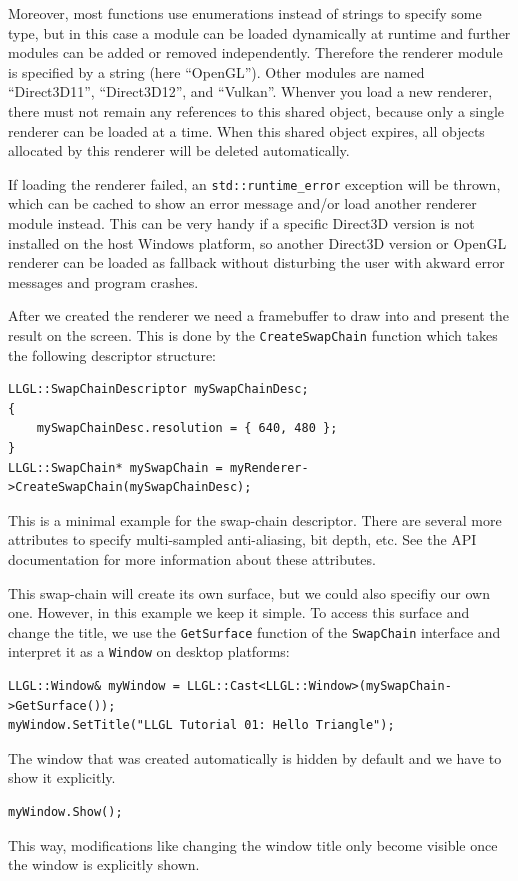 \documentclass{article}
\begin{document}
Moreover, most functions use enumerations instead of strings to specify some type, but in this case
a module can be loaded dynamically at runtime and further modules can be added or removed independently.
Therefore the renderer module is specified by a string (here ``OpenGL''). Other modules are
named ``Direct3D11'', ``Direct3D12'', and ``Vulkan''.
Whenver you load a new renderer, there must not remain any references to this shared object,
because only a single renderer can be loaded at a time.
When this shared object expires, all objects allocated by this renderer will be deleted automatically.

If loading the renderer failed, an \texttt{std::runtime\_error} exception will be thrown,
which can be cached to show an error message and/or load another renderer module instead.
This can be very handy if a specific Direct3D version is not installed on the host Windows platform,
so another Direct3D version or OpenGL renderer can be loaded as fallback
without disturbing the user with akward error messages and program crashes.

After we created the renderer we need a framebuffer to draw into and present the result on the screen.
This is done by the \texttt{CreateSwapChain} function which takes the following descriptor structure:
\begin{lstlisting}
LLGL::SwapChainDescriptor mySwapChainDesc;
{
    mySwapChainDesc.resolution = { 640, 480 };
}
LLGL::SwapChain* mySwapChain = myRenderer->CreateSwapChain(mySwapChainDesc);
\end{lstlisting}
This is a minimal example for the swap-chain descriptor. There are several more attributes
to specify multi-sampled anti-aliasing, bit depth, etc.
See the API documentation for more information about these attributes.

This swap-chain will create its own surface, but we could also specifiy our own one.
However, in this example we keep it simple. To access this surface and change the title,
we use the \texttt{GetSurface} function of the \texttt{SwapChain} interface
and interpret it as a \texttt{Window} on desktop platforms:
\begin{lstlisting}
LLGL::Window& myWindow = LLGL::Cast<LLGL::Window>(mySwapChain->GetSurface());
myWindow.SetTitle("LLGL Tutorial 01: Hello Triangle");
\end{lstlisting}
The window that was created automatically is hidden by default and we have to show it explicitly.
\begin{lstlisting}
myWindow.Show();
\end{lstlisting}
This way, modifications like changing the window title only become visible once the window is explicitly shown.
\end{document}
